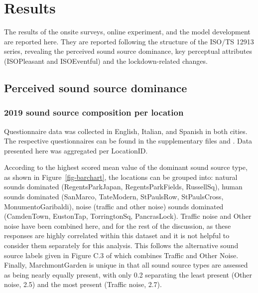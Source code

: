 \documentclass[
  authoryear,
  preprint,
  3p,
  onecolumn]{elsarticle}
\begin{document}
\section{Results}\label{results}

The results of the onsite surveys, online experiment, and the model
development are reported here. They are reported following the structure
of the ISO/TS 12913 series, revealing the perceived sound source
dominance, key perceptual attributes (ISOPleasant and ISOEventful) and
the lockdown-related changes.

\subsection{Perceived sound source
dominance}\label{perceived-sound-source-dominance}

\subsubsection{2019 sound source composition per
location}\label{sound-source-composition-per-location}

Questionnaire data was collected in English, Italian, and Spanish in
both cities. The respective questionnaires can be found in the
supplementary files and \citet{Mitchell2020Soundscape}. Data presented
here was aggregated per LocationID.

According to the highest scored mean value of the dominant sound source
type, as shown in Figure~\ref{fig-barchart}, the locations can be
grouped into: natural sounds dominated (RegentsParkJapan,
RegentsParkFields, RussellSq), human sounds dominated (SanMarco,
TateModern, StPaulsRow, StPaulsCross, MonumentoGaribaldi), noise
(traffic and other noise) sounds dominated (CamdenTown, EustonTap,
TorringtonSq, PancrasLock). Traffic noise and Other noise have been
combined here, and for the rest of the discussion, as these responses
are highly correlated within this dataset and it is not helpful to
consider them separately for this analysis. This follows the alternative
sound source labels given in Figure C.3 of \citet{ISO12913Part2} which
combines Traffic and Other Noise. Finally, MarchmontGarden is unique in
that all sound source types are assessed as being nearly equally
present, with only 0.2 separating the least present (Other noise, 2.5)
and the most present (Traffic noise, 2.7).
\end{document}

